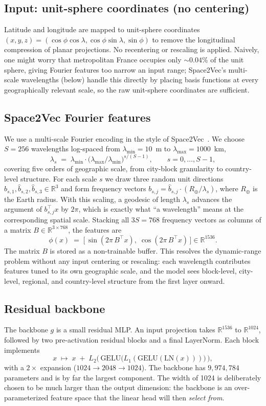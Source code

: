 \documentclass[11pt,a4paper]{article}
\begin{document}
\subsection{Input: unit-sphere coordinates (no centering)}
Latitude and longitude are mapped to unit-sphere coordinates
$(x, y, z) = (\cos\phi\cos\lambda, \cos\phi\sin\lambda, \sin\phi)$ to
remove the longitudinal compression of planar projections. No
recentering or rescaling is applied. Naively, one might worry that
metropolitan France occupies only $\sim$$0.04\%$ of the unit sphere,
giving Fourier features too narrow an input range; Space2Vec's
multi-scale wavelengths (below) handle this directly by placing basis
functions at every geographically relevant scale, so the raw
unit-sphere coordinates are sufficient.

\subsection{Space2Vec Fourier features}
We use a multi-scale Fourier encoding in the style of
Space2Vec~\cite{mai2020space2vec}. We choose $S = 256$ wavelengths
log-spaced from $\lambda_{\min} = 10$~m to
$\lambda_{\max} = 1000$~km,
\[
  \lambda_s \;=\; \lambda_{\min}
  \cdot \bigl(\lambda_{\max}/\lambda_{\min}\bigr)^{s/(S-1)},
  \qquad s = 0,\ldots,S-1,
\]
covering five orders of geographic scale, from city-block granularity
to country-level structure. For each scale $s$ we draw three random
unit directions
$\hat b_{s,1}, \hat b_{s,2}, \hat b_{s,3} \in \mathbb{R}^{3}$
and form frequency vectors
$b_{s,j} = \hat b_{s,j} \cdot (R_\oplus / \lambda_s)$, where $R_\oplus$
is the Earth radius. With this scaling, a geodesic of length
$\lambda_s$ advances the argument of $b_{s,j}^{\top} x$ by $2\pi$,
which is exactly what ``a wavelength'' means at the corresponding
spatial scale. Stacking all $3S = 768$ frequency vectors as columns
of a matrix $B \in \mathbb{R}^{3 \times 768}$, the features are
\[
  \phi(x) \;=\;
  \bigl[\,\sin(2\pi\, B^{\top} x),\;\cos(2\pi\, B^{\top} x)\,\bigr]
  \in \mathbb{R}^{1536}.
\]
The matrix $B$ is stored as a non-trainable buffer. This resolves the
dynamic-range problem without any input centering or rescaling: each
wavelength contributes features tuned to its own geographic scale,
and the model sees block-level, city-level, regional, and
country-level structure from the first layer onward.

\subsection{Residual backbone}
The backbone $g$ is a small residual MLP. An input projection takes
$\mathbb{R}^{1536}$ to $\mathbb{R}^{1024}$, followed by two
pre-activation residual blocks and a final LayerNorm. Each block
implements
\[
  x \;\mapsto\; x \;+\; L_2\!\bigl(\,\text{GELU}\bigl(L_1(\text{GELU}(\text{LN}(x)))\bigr)\,\bigr),
\]
with a $2\times$ expansion ($1024 \to 2048 \to 1024$). The backbone
has $9{,}974{,}784$ parameters and is by far the largest component.
The width of 1024 is deliberately chosen to be much larger than the
output dimension: the backbone is an over-parameterized feature space
that the linear head will then \emph{select from}.
\end{document}
